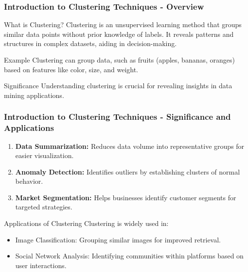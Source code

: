 \documentclass[aspectratio=169]{beamer}
\begin{document}
\frame{\titlepage}

\begin{frame}[fragile]
    \frametitle{Introduction to Clustering Techniques - Overview}
    \begin{block}{What is Clustering?}
        Clustering is an unsupervised learning method that groups similar data points without prior knowledge of labels. It reveals patterns and structures in complex datasets, aiding in decision-making.
    \end{block}
    
    \begin{block}{Example}
        Clustering can group data, such as fruits (apples, bananas, oranges) based on features like color, size, and weight.
    \end{block}
    
    \begin{block}{Significance}
        Understanding clustering is crucial for revealing insights in data mining applications.
    \end{block}
\end{frame}

\begin{frame}[fragile]
    \frametitle{Introduction to Clustering Techniques - Significance and Applications}
    \begin{enumerate}
        \item \textbf{Data Summarization:} Reduces data volume into representative groups for easier visualization.
        \item \textbf{Anomaly Detection:} Identifies outliers by establishing clusters of normal behavior.
        \item \textbf{Market Segmentation:} Helps businesses identify customer segments for targeted strategies.
    \end{enumerate}
    
    \begin{block}{Applications of Clustering}
        Clustering is widely used in:
        \begin{itemize}
            \item Image Classification: Grouping similar images for improved retrieval.
            \item Social Network Analysis: Identifying communities within platforms based on user interactions.
        \end{itemize}
    \end{block}
\end{frame}
\end{document}
